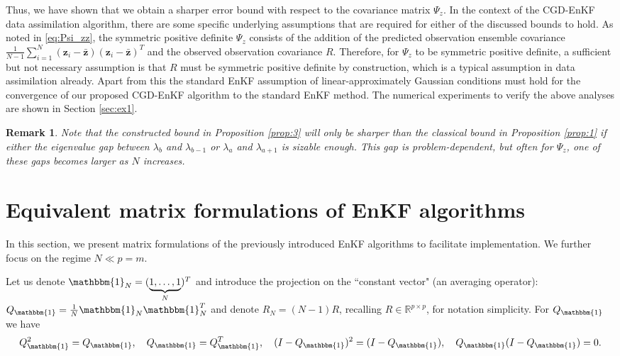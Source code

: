 \documentclass[11p]{elsarticle}
\numberwithin{equation}{section}
\newtheorem{remark}{Remark}
\newcommand{\vect}[1]{\ensuremath{\bm{#1}}}
\begin{document}
{Thus, we have shown that we obtain a sharper error bound with respect to the covariance matrix $\Psi_z$.  In the context of the CGD-EnKF data assimilation algorithm, there are some specific underlying assumptions that are required for either of the discussed bounds to hold.  As noted in \eqref{eq:Psi_zz}, the symmetric positive definite $\Psi_z$ consists of the addition of the predicted observation ensemble covariance $\frac{1}{N-1} \sum_{i=1}^{N}(\vect{z}_{i} - \vect{\bar{z}})(\vect{z}_{i} - \vect{\bar{z}})^T$ and the observed observation covariance $R$.  Therefore, for $\Psi_z$ to be symmetric positive definite, a sufficient but not necessary assumption is that $R$ must be symmetric positive definite by construction, which is a typical assumption in data assimilation already.  Apart from this the standard EnKF assumption of linear-approximately Gaussian conditions must hold for the convergence of our proposed CGD-EnKF algorithm to the standard EnKF method.  The numerical experiments to verify the above analyses are shown in Section \ref{sec:ex1}. 
}

\begin{remark}
Note that the constructed bound in Proposition \ref{prop:3} will only be sharper than the classical bound in Proposition \ref{prop:1} if either the eigenvalue gap between $\lambda_b$ and $\lambda_{b-1}$ or $\lambda_a$ and $\lambda_{a+1}$ is sizable enough.  This gap is problem-dependent, but often for $\Psi_z$, one of these gaps becomes larger as $N$ increases.
\end{remark}


\section{Equivalent matrix formulations of EnKF algorithms}
\label{sec:matrix_reform_alg}

In this section, we present matrix formulations of the previously introduced EnKF algorithms to facilitate implementation. We further focus on the regime $N\ll p = m$.

Let us denote 
\(\mathbbm{1}_N=(\underbrace{1,\ldots,1}_{N})^T\) 
and introduce the projection on the ``constant vector" (an averaging operator): 
\(Q_{\mathbbm{1}}=\frac{1}{N}\mathbbm{1}_N\mathbbm{1}_N^T\) and denote $R_N=(N-1)R$, recalling $R\in\mathbb{R}^{p\times p}$, for notation simplicity. For $Q_{\mathbbm{1}}$ we have
\begin{equation}\label{Q-1}
Q_{\mathbbm{1}}^2=Q_{\mathbbm{1}},\quad Q_{\mathbbm{1}}=Q_{\mathbbm{1}}^T, \quad
(I-Q_{\mathbbm{1}})^2=(I-Q_{\mathbbm{1}}),\quad Q_{\mathbbm{1}}(I-Q_{\mathbbm{1}})=0. 
\end{equation}
\end{document}
